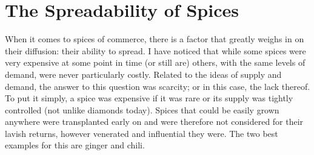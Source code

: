 \section{The Spreadability of Spices}
\label{sec:spreadability}

When it comes to spices of commerce, there is a factor that greatly weighs in on their diffusion: their ability to spread. I have noticed that while some spices were very expensive at some point in time (or still are) others, with the same levels of demand, were never particularly costly. Related to the ideas of supply and demand, the answer to this question was scarcity; or in this case, the lack thereof. To put it simply, a spice was expensive if it was rare or its supply was tightly controlled (not unlike diamonds today). Spices that could be easily grown anywhere were transplanted early on and were therefore not considered for their lavish returns, however venerated and influential they were. The two best examples for this are ginger and chili. 

